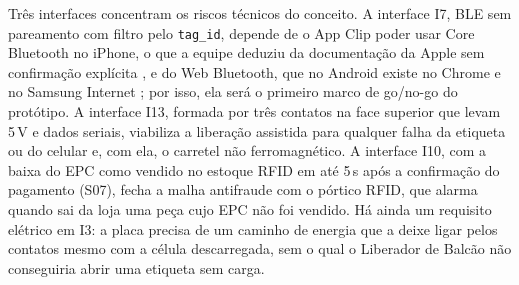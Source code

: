 Três interfaces concentram os riscos técnicos do conceito. A interface I7, BLE sem pareamento com filtro pelo \texttt{tag\_id}, depende de o App Clip poder usar Core Bluetooth no iPhone, o que a equipe deduziu da documentação da Apple sem confirmação explícita \cite{apple2026appclipfuncoes, apple2020forumble}, e do Web Bluetooth, que no Android existe no Chrome e no Samsung Internet \cite{chrome2026webbluetooth}; por isso, ela será o primeiro marco de go/no-go do protótipo. A interface I13, formada por três contatos na face superior que levam 5\,V e dados seriais, viabiliza a liberação assistida para qualquer falha da etiqueta ou do celular e, com ela, o carretel não ferromagnético. A interface I10, com a baixa do EPC como vendido no estoque RFID em até 5\,s após a confirmação do pagamento (S07), fecha a malha antifraude com o pórtico RFID, que alarma quando sai da loja uma peça cujo EPC não foi vendido. Há ainda um requisito elétrico em I3: a placa precisa de um caminho de energia que a deixe ligar pelos contatos mesmo com a célula descarregada, sem o qual o Liberador de Balcão não conseguiria abrir uma etiqueta sem carga.


